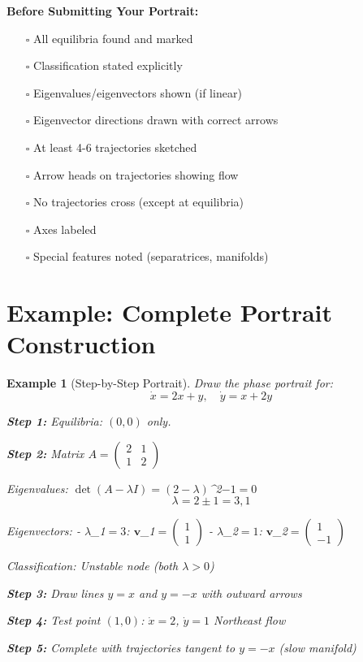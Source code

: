 \documentclass[12pt]{article}
\newtheorem{example}{Example}
\begin{document}
\begin{examtip}
\textbf{Before Submitting Your Portrait:}
\begin{itemize}
    \item[$\square$] All equilibria found and marked
    \item[$\square$] Classification stated explicitly
    \item[$\square$] Eigenvalues/eigenvectors shown (if linear)
    \item[$\square$] Eigenvector directions drawn with correct arrows
    \item[$\square$] At least 4-6 trajectories sketched
    \item[$\square$] Arrow heads on trajectories showing flow
    \item[$\square$] No trajectories cross (except at equilibria)
    \item[$\square$] Axes labeled
    \item[$\square$] Special features noted (separatrices, manifolds)
\end{itemize}
\end{examtip}

\section{Example: Complete Portrait Construction}

\begin{example}[Step-by-Step Portrait]
Draw the phase portrait for:
$$\dot{x} = 2x + y, \quad \dot{y} = x + 2y$$

\textbf{Step 1:} Equilibria: $(0,0)$ only.

\textbf{Step 2:} Matrix $A = \begin{pmatrix} 2 & 1 \\ 1 & 2 \end{pmatrix}$

Eigenvalues: $\det(A - \lambda I) = (2-\lambda)$^{2}$ - 1 = 0$
$$\lambda = 2 \pm 1 = 3, 1$$

Eigenvectors:
- $\lambda$_{1}$ = 3$: $\mathbf{v}$_{1}$ = \begin{pmatrix} 1 \\ 1 \end{pmatrix}$
- $\lambda$_{2}$ = 1$: $\mathbf{v}$_{2}$ = \begin{pmatrix} 1 \\ -1 \end{pmatrix}$

Classification: Unstable node (both $\lambda > 0$)

\textbf{Step 3:} Draw lines $y = x$ and $y = -x$ with outward arrows

\textbf{Step 4:} Test point $(1, 0)$: $\dot{x} = 2$, $\dot{y} = 1$ \rightarrow Northeast flow

\textbf{Step 5:} Complete with trajectories tangent to $y = -x$ (slow manifold)
\end{example}
\end{document}
